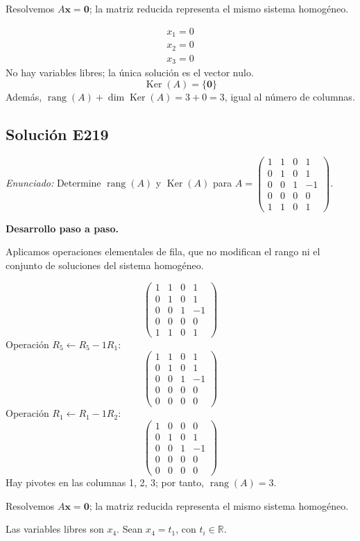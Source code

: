 \documentclass[12pt]{article}
\theoremstyle{remark}
\newcommand{\rang}{\operatorname{rang}}
\newcommand{\Ker}{\operatorname{Ker}}
\newcommand{\vect}[1]{\boldsymbol{#1}}
\newcommand{\solucion}[2]{\Needspace{11\baselineskip}\subsection*{Solución E#1}\noindent\textit{Enunciado:} #2\par\medskip\noindent\textbf{Desarrollo paso a paso.}\par\medskip}
\begin{document}
Resolvemos $A\vect x=\vect0$; la matriz reducida representa el mismo sistema homogéneo.

\[
\begin{aligned}x_{1}=0\\x_{2}=0\\x_{3}=0\end{aligned}
\]
No hay variables libres; la única solución es el vector nulo.
\[
\boxed{\Ker(A)=\{\vect0\}}
\]
Además, $\rang(A)+\dim\Ker(A)=3+0=3$, igual al número de columnas.


\medskip

\solucion{219}{Determine $\rang(A)$ y $\Ker(A)$ para $A=\begin{pmatrix}1&1&0&1\\0&1&0&1\\0&0&1&-1\\0&0&0&0\\1&1&0&1\end{pmatrix}$.}
Aplicamos operaciones elementales de fila, que no modifican el rango ni el conjunto de soluciones del sistema homogéneo.

\[
\begin{pmatrix}1&1&0&1\\0&1&0&1\\0&0&1&-1\\0&0&0&0\\1&1&0&1\end{pmatrix}
\]
Operación $R_{5}\leftarrow R_{5}-1R_{1}$:
\[
\begin{pmatrix}1&1&0&1\\0&1&0&1\\0&0&1&-1\\0&0&0&0\\0&0&0&0\end{pmatrix}
\]
Operación $R_{1}\leftarrow R_{1}-1R_{2}$:
\[
\begin{pmatrix}1&0&0&0\\0&1&0&1\\0&0&1&-1\\0&0&0&0\\0&0&0&0\end{pmatrix}
\]
Hay pivotes en las columnas 1, 2, 3; por tanto, $\boxed{\rang(A)=3}$.

Resolvemos $A\vect x=\vect0$; la matriz reducida representa el mismo sistema homogéneo.

Las variables libres son $x_{4}$. Sean $x_{4}=t_{1}$, con $t_i\in\mathbb R$.
\end{document}
